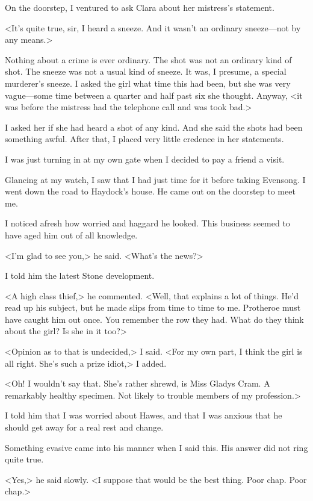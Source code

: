 On the doorstep, I ventured to ask Clara about her mistress's statement.

<It's quite true, sir, I heard a sneeze. And it wasn't an ordinary sneeze—not by any means.>

Nothing about a crime is ever ordinary. The shot was not an ordinary kind of shot. The sneeze was not a usual kind of sneeze. It was, I presume, a special murderer's sneeze. I asked the girl what time this had been, but she was very vague—some time between a quarter and half past six she thought. Anyway, <it was before the mistress had the telephone call and was took bad.>

I asked her if she had heard a shot of any kind. And she said the shots had been something awful. After that, I placed very little credence in her statements.

I was just turning in at my own gate when I decided to pay a friend a visit.

Glancing at my watch, I saw that I had just time for it before taking Evensong. I went down the road to Haydock's house. He came out on the doorstep to meet me.

I noticed afresh how worried and haggard he looked. This business seemed to have aged him out of all knowledge.

<I'm glad to see you,> he said. <What's the news?>

I told him the latest Stone development.

<A high class thief,> he commented. <Well, that explains a lot of things. He'd read up his subject, but he made slips from time to time to me. Protheroe must have caught him out once. You remember the row they had. What do they think about the girl? Is she in it too?>

<Opinion as to that is undecided,> I said. <For my own part, I think the girl is all right. She's such a prize idiot,> I added.

<Oh! I wouldn't say that. She's rather shrewd, is Miss Gladys Cram. A remarkably healthy specimen. Not likely to trouble members of my profession.>

I told him that I was worried about Hawes, and that I was anxious that he should get away for a real rest and change.

Something evasive came into his manner when I said this. His answer did not ring quite true.

<Yes,> he said slowly. <I suppose that would be the best thing. Poor chap. Poor chap.>

